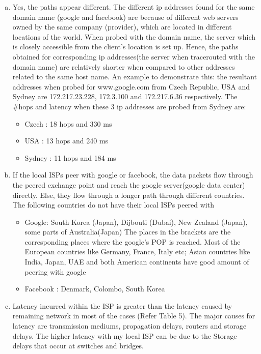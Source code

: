 \documentclass{article}
\begin{document}
\begin{enumerate}[a)]
\begin{itemize}
        \end{itemize}{}
        \item Yes, the paths appear different. The different ip addresses found for the same domain name (google and facebook) are because of different web servers owned by the same company (provider), which are located in different locations of the world. When probed with the domain name, the server which is closely accessible from the client's location is set up.
        Hence, the paths obtained for corresponding ip addresses(the server when tracerouted with the domain name) are relatively shorter when compared to other addresses related to the same host name.
        An example to demonstrate this: the resultant addresses when probed for www.google.com from Czech Republic, USA and Sydney are 172.217.23.228, 172.3.100 and 172.217.6.36 respectively. The \#hops and latency when these 3 ip addresses are probed from Sydney are:
        \begin{itemize}
            \item Czech : 18 hops and 330 ms
            \item USA : 13 hops and 240 ms
            \item Sydney : 11 hops and 184 ms
        \end{itemize}{}
        \item If the local ISPs peer with google or facebook, the data packets flow through the peered exchange point and reach the google server(google data center) directly. Else, they flow through a longer path through different countries. The following countries do not have their local ISPs peered with
        \begin{itemize}
            \item Google: South Korea (Japan), Dijbouti (Dubai), New Zealand (Japan), some parts of Australia(Japan)
            {The places in the brackets are the corresponding places where the google's POP is reached. Most of the European countries like Germany, France, Italy etc; Asian countries like India, Japan, UAE and both American continents have good amount of peering with google}
            \item Facebook : Denmark, Colombo, South Korea
        \end{itemize}
        \item Latency incurred within the ISP is greater than the latency caused by remaining network in most of the cases (Refer Table 5). The major causes for latency are transmission mediums, propagation delays, routers and storage delays. The higher latency with my local ISP can be due to the Storage delays that occur at switches and bridges.

\end{enumerate}
\end{document}
